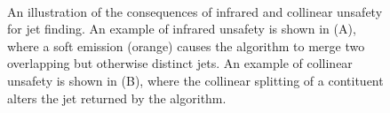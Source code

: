 \begin{figure}[htbp]
  \centering
  \mbox{
     \qquad
     \qquad
  }
  \caption[Infrared and Collinear Unsafety]{An illustration of the consequences of infrared and collinear unsafety for jet finding. An example of infrared unsafety is shown in (A), where a soft emission (orange) causes the algorithm to merge two overlapping but otherwise distinct jets. An example of collinear unsafety is shown in (B), where the collinear splitting of a contituent alters the jet returned by the algorithm.}
    \label{fig:IRCunsafe}
\end{figure}

